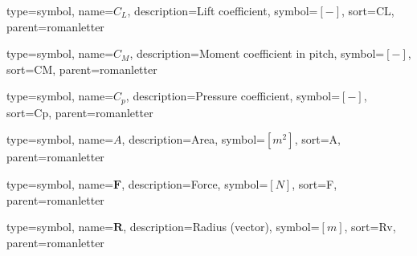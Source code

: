 {
type=symbol, %
name={\ensuremath{C_L}}, %
description={Lift coefficient}, %
symbol={$\left[-\right]$}, %
sort=CL, %
parent=romanletter %
}

{
type=symbol, %
name={\ensuremath{C_M}}, %
description={Moment coefficient in pitch}, %
symbol={$\left[-\right]$}, %
sort=CM, %
parent=romanletter %
}

{
	type=symbol, %
	name={\ensuremath{C_p}}, %
	description={Pressure coefficient}, %
	symbol={$\left[-\right]$}, %
	sort=Cp, %
	parent=romanletter %
}

{
type=symbol, %
name={\ensuremath{A}}, %
description={Area}, %
symbol={$\left[m^2\right]$}, %
sort=A, %
parent=romanletter %
}

{
type=symbol, %
name={\ensuremath{\mathbf{F}}}, %
description={Force}, %
symbol={$\left[N\right]$}, %
sort=F, %
parent=romanletter %
}

{
type=symbol, %
name={\ensuremath{\mathbf{R}}}, %
description={Radius (vector)}, %
symbol={$\left[m\right]$}, %
sort=Rv, %
parent=romanletter %
}

